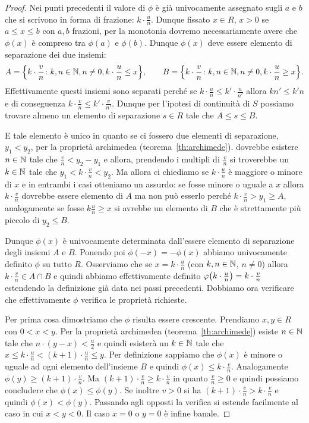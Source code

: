 \begin{proof}
Nei punti precedenti il valore di $\phi$ è già univocamente assegnato sugli $a$ e $b$ 
che si scrivono in forma di frazione: $k\cdot \frac u n$.
Dunque fissato $x\in R$, $x>0$ 
se $a \le x \le b$ con $a,b$ frazioni, 
per la monotonia 
dovremo necessariamente avere che $\phi(x)$ è 
compreso tra $\phi(a)$ e $\phi(b)$.
Dunque $\phi(x)$ deve essere elemento di separazione 
dei due insiemi:
\[
A = {\left\{ k \cdot \frac v n \colon k,n\in {\mathbb N}, n\neq 0, k\cdot \frac u n \le x  \right\}},\qquad
B = {\left\{ k \cdot \frac v n \colon k,n\in {\mathbb N}, n\neq 0, k\cdot \frac u n \ge x \right\}}.
\]
Effettivamente questi insiemi sono separati 
perché se $k\cdot \frac u n \le k'\cdot \frac u {n'}$ allora $kn'\le k'n$ 
e di conseguenza $k\cdot \frac v n \le k' \cdot \frac v {n'}$.
Dunque per l'ipotesi di continuità di $S$ 
possiamo trovare almeno un elemento di separazione $s\in R$ 
tale che $A\le s \le B$.

E tale elemento è unico in quanto se ci fossero due elementi di separazione, 
$y_1<y_2$, per la proprietà archimedea (teorema~\ref{th:archimede}).
dovrebbe esistere $n\in {\mathbb N}$ tale che $\frac v n < y_2-y_1$
e allora, prendendo i multipli di $\frac v n$ si troverebbe un $k\in{\mathbb N}$ 
tale che $y_1 < k\cdot \frac v n < y_2$. 
Ma allora ci chiediamo se $k\cdot \frac u n$ è maggiore o minore di $x$ e 
in entrambi i casi otteniamo un assurdo: se fosse minore o uguale a $x$ 
allora $k\cdot \frac v n$ dovrebbe essere elemento di $A$ ma non può esserlo 
perché $k\cdot \frac v n>y_1\ge A$, 
analogamente se fosse $k\frac u n \ge x$ 
si avrebbe un elemento di $B$ che è strettamente più piccolo di $y_2\le B$.

Dunque $\phi(x)$ è univocamente determinata dall'essere elemento di 
separazione degli insiemi $A$ e $B$.
Ponendo poi $\phi(-x) = -\phi(x)$ abbiamo univocamente definito $\phi$ 
su tutto $R$. 
Osserviamo che se $x=k\cdot \frac u n$ (con $k,n\in {\mathbb N}$, $n\neq 0$)
allora $k\cdot \frac v n \in A\cap B$ e quindi abbiamo effettivamente 
definito $\varphi{\left( k\cdot \frac u n \right)} = k\cdot \frac v n$ estendendo la definizione 
già data nei passi precedenti.
Dobbiamo ora verificare che effettivamente $\phi$ 
verifica le proprietà richieste.

Per prima cosa dimostriamo che $\phi$ risulta essere crescente. 
Prendiamo $x,y\in R$ con $0<x<y$.
Per la proprietà archimedea (teorema~\ref{th:archimede})
esiste $n\in {\mathbb N}$ tale che $n\cdot(y-x) < \frac u 2$ 
e quindi esisterà un $k\in {\mathbb N}$ 
tale che $x \le k \cdot \frac u n < (k+1)\cdot \frac u n \le y$.
Per definizione sappiamo che $\phi(x)$ è minore o uguale ad ogni 
elemento dell'insieme $B$ e quindi $\phi(x) \le k\cdot \frac v n$.
Analogamente $\phi(y) \ge (k+1)\cdot \frac v n$. 
Ma $(k+1)\cdot \frac v n \ge k\cdot \frac v n$ in quanto $\frac v n\ge 0$ 
e quindi possiamo concludere che $\phi(x) \le \phi(y)$.
Se inoltre $v>0$ si ha $(k+1)\cdot \frac v n > k\cdot \frac v n$
e quindi $\phi(x) < \phi(y)$.
Passando agli opposti la verifica si estende facilmente al caso in cui $x<y<0$.
Il caso $x= 0$ o $y=0$ è infine banale.


\end{proof}
